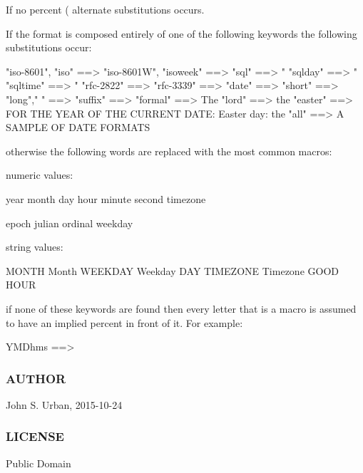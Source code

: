 \begin{DoxyVerb}
If no percent (%
alternate substitutions occurs.

If the format is composed entirely of one of the following
keywords the following substitutions occur:

  "iso-8601",
  "iso"        ==> %
  "iso-8601W",
  "isoweek"    ==> %
  "sql"        ==> "%
  "sqlday"     ==> "%
  "sqltime"    ==> "%
  "rfc-2822"   ==> %
  "rfc-3339"   ==> %
  "date"       ==> %
  "short"      ==> %
  "long"," "   ==> %
  "suffix"     ==> %
  "formal"     ==> The %
  "lord"       ==> the %
  "easter"     ==> FOR THE YEAR OF THE CURRENT DATE:
                   Easter day: the %
  "all"        ==> A SAMPLE OF DATE FORMATS

otherwise the following words are replaced with the most
common macros:

numeric values:

   year     %
   month    %
   day      %
   hour     %
   minute   %
   second   %
   timezone %

   epoch    %
   julian   %
   ordinal  %
   weekday  %

string values:

   MONTH    %
   Month    %
   WEEKDAY  %
   Weekday  %
   DAY      %
   TIMEZONE %
   Timezone %
   GOOD     %
   HOUR     %

if none of these keywords are found then every letter that
is a macro is assumed to have an implied percent in front
of it. For example:

   YMDhms ==> %
\end{DoxyVerb}
 \subsubsection*{A\+U\+T\+H\+OR}

John S. Urban, 2015-\/10-\/24 \subsubsection*{L\+I\+C\+E\+N\+SE}

Public Domain 

